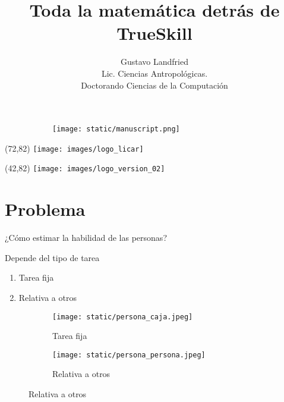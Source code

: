 \documentclass[shownotes]{beamer}
\title[Estimaci\'on de habilidad]{Toda la matem\'atica detr\'as de TrueSkill}
\author[Gustavo Landfried]{Gustavo Landfried \\ \vspace{0.2cm}
\scriptsize Lic. Ciencias Antropol\'ogicas. \\
Doctorando Ciencias de la Computaci\'on \\
\vspace{-0.3cm}}
\institute[DC-ICC-CONICET]{Instituto de Ciencias de la Computaci\'on (UBA -- CONICET) \vspace{-0.3cm}}
\date{}
\begin{document}
\begin{frame}[noframenumbering]
 \vspace{-0.5cm}
  \begin{figure}[H]     
     \centering
     \begin{subfigure}[b]{0.50\textwidth}
       \texttt{[image: static/manuscript.png]} 
     \end{subfigure}
   \end{figure} 

\vspace{-1cm}
\maketitle

 \begin{textblock}{80}(72,82)
 \texttt{[image: images/logo\_licar]} 
 \end{textblock}
  \begin{textblock}{80}(42,82)
 \texttt{[image: images/logo\_version\_02]} 
\end{textblock}

\end{frame}
\small

\section{Problema}

\begin{frame}

\begin{mdframed}[backgroundcolor=black!15]
 \centering \Large
 ¿C\'omo estimar la habilidad de las personas?
\end{mdframed}

\vspace{0.25cm}

\begin{center}
 \large Depende del tipo de tarea
\end{center}

\begin{enumerate}
 \item Tarea fija
 \item Relativa a otros
\end{enumerate}

  \begin{figure}[H]     
     \centering
     \begin{subfigure}[b]{0.25\textwidth}
       \texttt{[image: static/persona\_caja.jpeg]} 
     \caption*{Tarea fija}
     \end{subfigure}
     \hspace{1cm}
     \begin{subfigure}[b]{0.25\textwidth}
       \texttt{[image: static/persona\_persona.jpeg]} 
       \caption*{Relativa a otros}
     \end{subfigure}
   \end{figure} 
\end{frame}
\end{document}
